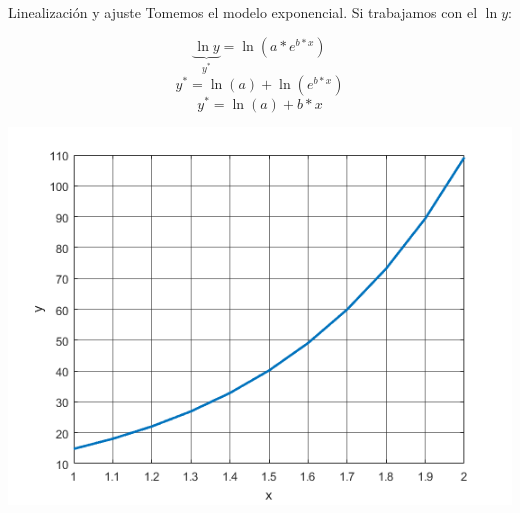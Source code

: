 \documentclass[xcolor=svgnames]{beamer} %
\theoremstyle{plain}
\theoremstyle{definition}
\begin{document}
\begin{frame}{Linealización y ajuste}
  Tomemos el modelo exponencial. Si trabajamos con el $\ln{y}$:
  \begin{minipage}{.45\linewidth}
    $$ \underbrace{\ln{y}}_{y^*} = \ln (a * e^{b*x}) $$
    $$y^* = \ln(a) + \ln(e^{b*x}) $$
    $$ y^* = \ln(a) + b*x $$
  \end{minipage} \begin{minipage}{.45\linewidth}
    \includegraphics[scale=.3]{lin/exp.png} \\
  \end{minipage}

\end{frame}
\end{document}
